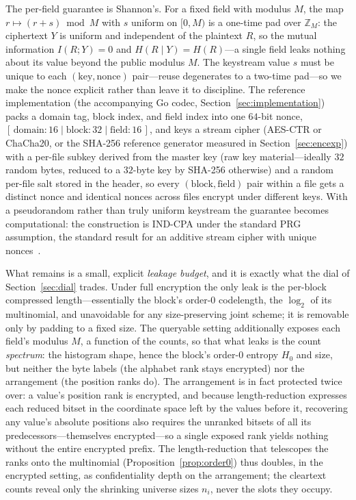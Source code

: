 \documentclass[entropy,article,submit,oneauthor,pdftex]{Definitions/mdpi}
\begin{document}
The per-field guarantee is Shannon's. For a fixed field with modulus $M$, the map
$r\mapsto(r+s)\bmod M$ with $s$ uniform on $[0,M)$ is a one-time pad over $\mathbb{Z}_M$:
the ciphertext $Y$ is uniform and independent of the plaintext $R$, so the mutual
information $I(R;Y)=0$ and $H(R\mid Y)=H(R)$---a single field leaks nothing about its value
beyond the public modulus
$M$. The keystream value $s$ must be unique to each $(\text{key},\text{nonce})$
pair---reuse degenerates to a two-time pad---so we make the nonce explicit rather than
leave it to discipline. The reference implementation (the accompanying Go codec,
Section~\ref{sec:implementation}) packs a domain tag, block index, and field index into one
$64$-bit nonce, $[\,\mathrm{domain}{:}16\mid\mathrm{block}{:}32\mid\mathrm{field}{:}16\,]$,
and keys a stream cipher (AES-CTR or ChaCha20, or the SHA-256 reference generator measured
in Section~\ref{sec:encexp}) with a per-file subkey derived from the master
key (raw key material---ideally $32$ random bytes, reduced to a $32$-byte key by SHA-256
otherwise) and a random per-file salt stored in the header, so every
$(\text{block},\text{field})$
pair within a file gets a distinct nonce and identical nonces across files encrypt under
different keys. With a pseudorandom rather than truly uniform keystream the guarantee
becomes computational: the construction is IND-CPA under the standard PRG assumption, the
standard result for an additive stream cipher with unique nonces~\cite{katz2020modern}.

What remains is a small, explicit \emph{leakage budget}, and it is exactly what the dial of
Section~\ref{sec:dial} trades. Under full encryption the only leak is the per-block
compressed length---essentially the block's order-$0$ codelength, the $\log_2$ of its
multinomial, and unavoidable for any size-preserving joint scheme; it is removable only by
padding to a fixed size. The queryable setting additionally exposes each field's modulus
$M$, a function of the counts, so that what leaks is the count \emph{spectrum}: the
histogram shape, hence the block's order-$0$ entropy $H_0$ and size, but neither the byte
labels (the alphabet rank stays encrypted) nor the arrangement (the position ranks do).
The arrangement is in fact protected twice over: a value's position rank is encrypted, and
because length-reduction expresses each reduced bitset in the coordinate space left by the
values before it, recovering any value's absolute positions also requires the unranked
bitsets of all its predecessors---themselves encrypted---so a single exposed rank yields
nothing without the entire encrypted prefix. The length-reduction that telescopes the ranks
onto the multinomial (Proposition~\ref{prop:order0}) thus doubles, in the encrypted setting,
as confidentiality depth on the arrangement; the cleartext counts reveal only the shrinking
universe sizes $n_i$, never the slots they occupy.
\end{document}
